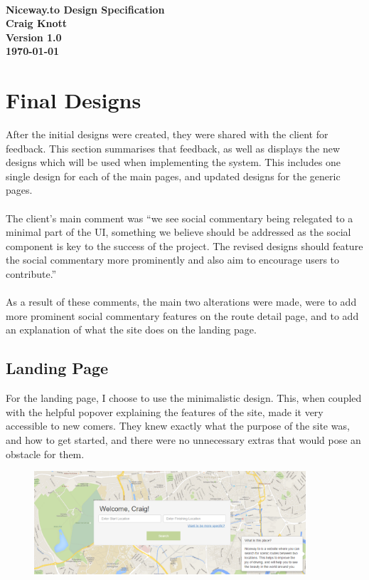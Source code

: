 \documentclass[a4paper,twoside,notitlepage,11pt]{article}
\newcommand{\paperTitle}{Niceway.to Design Specification}
\begin{document}
\begin{center}
 \ \\[4cm]
 {\LARGE \textbf{\paperTitle} \\ [0.2cm]}
   \textbf{Craig Knott} \\
    \textbf{Version 1.0}\\
	 \textbf{\today}
\end{center}

 \tableofcontents
  \newpage
   \pagestyle{plain}
 




 \section{Final Designs}
 After the initial designs were created, they were shared with the client for feedback. This section summarises that feedback, as well as displays the new designs which will be used when implementing the system. This includes one single design for each of the main pages, and updated designs for the generic pages.\ \\
 \ \\
 The client's main comment was ``we see social commentary being relegated to a minimal part of the UI, something we believe should be addressed as the social component is key to the success of the project. The revised designs should feature the social commentary more prominently and also aim to encourage users to contribute.''\ \\
 \ \\
 As a result of these comments, the main two alterations were made, were to add more prominent social commentary features on the route detail page, and to add an explanation of what the site does on the landing page.
 \newpage

\subsection{Landing Page}
For the landing page, I choose to use the minimalistic design. This, when coupled with the helpful popover explaining the features of the site, made it very accessible to new comers. They knew exactly what the purpose of the site was, and how to get started, and there were no unnecessary extras that would pose an obstacle for them.
 \begin{figure}[!ht]
 	\begin{center}
 		\includegraphics[width=0.9\textwidth]{images/final/landing.png}
 	\end{center}
 	\vspace{-6mm}
 \end{figure}
 
\end{document}
